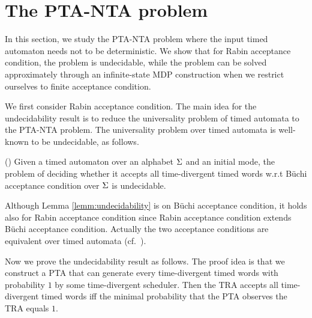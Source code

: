 \section{The PTA-NTA problem}
In this section, we study the PTA-NTA problem where the input timed automaton needs not to be deterministic.
We show that for Rabin acceptance condition, the problem is undecidable, while the problem can be solved approximately through an infinite-state MDP construction when we restrict ourselves to finite acceptance condition.

We first consider Rabin acceptance condition. The main idea for the undecidability result is to reduce the universality problem of timed automata to the PTA-NTA problem. The universality problem over timed automata is well-known to be undecidable, as follows.

%
%
\begin{lemma}{(\cite[Theorem 5.2]{DBLP:conf/tapsoft/Vaandrager97})}\label{lemm:undecidability}
Given a timed automaton over an alphabet $\Sigma$ and an initial mode, the problem of deciding whether it accepts all time-divergent timed words w.r.t B\"{u}chi acceptance condition over $\Sigma$ is undecidable.
\end{lemma}
%
Although Lemma \ref{lemm:undecidability} is on  B\"{u}chi acceptance condition, it holds also for Rabin acceptance condition since Rabin acceptance condition extends  B\"{u}chi acceptance condition.
Actually the two acceptance conditions are equivalent over timed automata (cf.~\cite[Theorem 3.20]{DBLP:conf/tapsoft/Vaandrager97}).

Now we prove the undecidability result as follows.
The proof idea is that we construct a PTA that can generate every time-divergent timed words with probability $1$ by some time-divergent scheduler.
Then the TRA accepts all time-divergent timed words iff the minimal probability that the PTA observes the TRA equals $1$.

